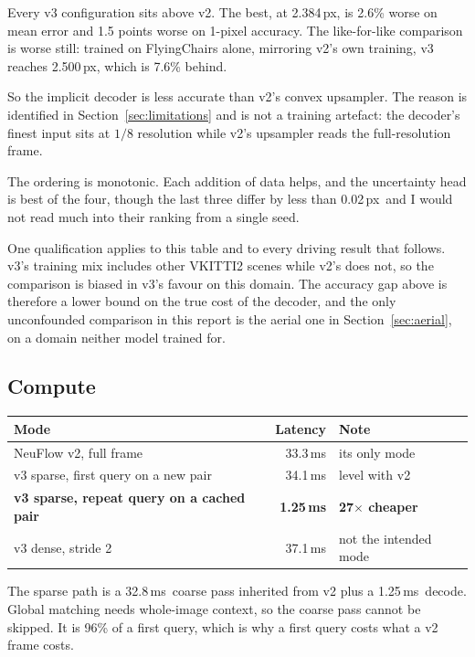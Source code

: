\documentclass[11pt,a4paper]{article}
\newcommand{\px}{\,px}
\newcommand{\ms}{\,ms}
\begin{document}
Every v3 configuration sits above v2. The best, at 2.384\px, is 2.6\% worse on
mean error and 1.5 points worse on 1-pixel accuracy. The like-for-like comparison
is worse still: trained on FlyingChairs alone, mirroring v2's own training, v3
reaches 2.500\px, which is 7.6\% behind.

So the implicit decoder is less accurate than v2's convex upsampler. The reason is
identified in Section~\ref{sec:limitations} and is not a training artefact: the
decoder's finest input sits at $1/8$ resolution while v2's upsampler reads the
full-resolution frame.

The ordering is monotonic. Each addition of data helps, and the uncertainty head is
best of the four, though the last three differ by less than 0.02\px\ and I would
not read much into their ranking from a single seed.

One qualification applies to this table and to every driving result that follows.
v3's training mix includes other VKITTI2 scenes while v2's does not, so the
comparison is biased in v3's favour on this domain. The accuracy gap above is
therefore a lower bound on the true cost of the decoder, and the only
unconfounded comparison in this report is the aerial one in Section~\ref{sec:aerial}, on a
domain neither model trained for.

\subsection{Compute}
\begin{center}
\small
\begin{tabular}{lrl}
\toprule
Mode & Latency & Note \\
\midrule
NeuFlow v2, full frame & 33.3\ms & its only mode \\
v3 sparse, first query on a new pair & 34.1\ms & level with v2 \\
\textbf{v3 sparse, repeat query on a cached pair} & \textbf{1.25\ms} & \textbf{27$\times$ cheaper} \\
v3 dense, stride 2 & 37.1\ms & not the intended mode \\
\bottomrule
\end{tabular}
\end{center}

The sparse path is a 32.8\ms\ coarse pass inherited from v2 plus a 1.25\ms\
decode. Global matching needs whole-image context, so the coarse pass cannot be
skipped. It is 96\% of a first query, which is why a first query costs what a v2
frame costs.
\end{document}
